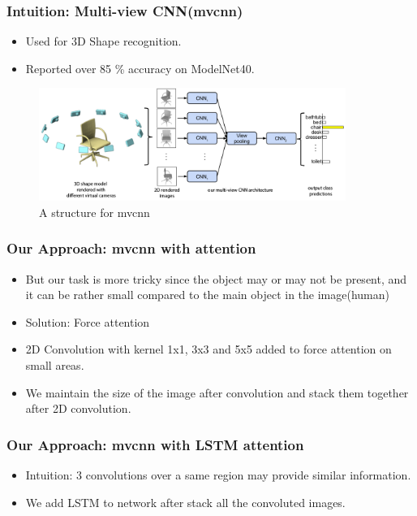 \documentclass{beamer}
\begin{document}
\begin{frame}
\frametitle{Intuition: Multi-view CNN(mvcnn)\cite{su15mvcnn}}

	\begin{itemize}
		\item Used for 3D Shape recognition.
		\item Reported over 85 \% accuracy on ModelNet40.
	\end{itemize}
	\begin{figure}
		\centering
		\includegraphics[width=10cm]{../Pic/mvcnn.png}
		\caption{A structure for mvcnn}
	\end{figure}

\end{frame}

\begin{frame}
\frametitle{Our Approach: mvcnn with attention}

	\begin{itemize}
		\item But our task is more tricky since the object may or may not be present, and it can be rather small compared to the main object in the image(human)
		\item Solution: Force attention
		\item 2D Convolution with kernel 1x1, 3x3 and 5x5 added to force attention on small areas.
		\item We maintain the size of the image after convolution and stack them together after 2D convolution.
	\end{itemize}

\end{frame}

\begin{frame}
\frametitle{Our Approach: mvcnn with LSTM attention}

	\begin{itemize}
		\item Intuition: 3 convolutions over a same region may provide similar information.
		\item We add LSTM to network after stack all the convoluted images.
	\end{itemize}

\end{frame}
\end{document}

